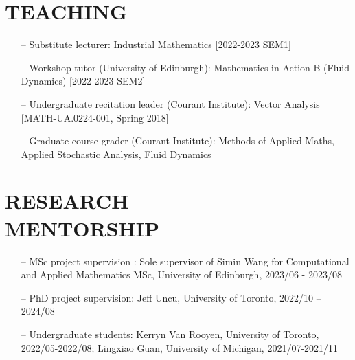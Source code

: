 \documentclass[margin]{res}
\begin{document}
\begin{resume}

\section{{\normalfont TEACHING}}
\begin{itemize}[leftmargin=*,noitemsep]
\item[--]{Substitute lecturer: Industrial Mathematics [2022-2023 SEM1]}
\item[--]{Workshop tutor (University of Edinburgh): Mathematics in Action B (Fluid Dynamics) [2022-2023 SEM2]}
\item[--]{Undergraduate recitation leader  (Courant Institute): Vector Analysis [MATH-UA.0224-001, Spring 2018]}
\item[--]{Graduate course grader  (Courant Institute): Methods of Applied Maths, Applied Stochastic Analysis, Fluid Dynamics}
\end{itemize}
\section{{\normalfont RESEARCH\\MENTORSHIP}}
\begin{itemize}[leftmargin=*,noitemsep]
\item[--]{MSc project supervision : Sole supervisor of Simin Wang for Computational and Applied Mathematics MSc, University of Edinburgh, 2023/06 - 2023/08} 
\item[--]{PhD project supervision: Jeff Uncu, University of Toronto, 2022/10 -- 2024/08}
\item[--]{Undergraduate students: Kerryn Van Rooyen, University of Toronto, 2022/05-2022/08; Lingxiao Guan, University of Michigan, 2021/07-2021/11}
\end{itemize}


\end{resume}
\end{document}
